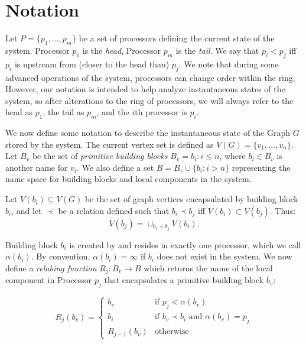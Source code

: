 \documentclass{article}
\begin{document}
\section{Notation}

\noindent
Let $P = \{p_1, \ldots, p_m\}$ be a set of processors defining the
current state of the system. Processor $p_1$ is the \emph{head}, Processor
$p_m$ is the \emph{tail}.  We say that $p_i < p_j$ iff $p_i$ is upstream
from (closer to the head than) $p_j$.  We note that during some advanced
operations of the system, processors can change order within the ring.  
However, our notation is intended to help analyze instantaneous states 
of the system, so after alterations to the ring of processors, we will 
always refer to the head as $p_1$, the tail as $p_m$, and the $i$th
processor is $p_i$.


We now define some notation to describe the instantaneous state of the 
Graph $G$ stored by the system.
The current vertex set is defined as $V(G) = \{v_1, \ldots, v_n\}$.
Let $B_v$ be the set of \emph{primitive building blocks} 
$B_v = {b_i : i \le n}$, where $b_i \in B_v$ is another name for $v_i$.  We
also define a set $B  = B_v \cup \{b_i : i > n\}$ representing the 
name space for building blocks and local components in the system.

Let $V(b_i) \subseteq V(G)$ be the set of graph vertices 
encapsulated by building block $b_i$, and
let $\prec$ be a relation defined such that $b_i \prec b_j$ 
iff $V(b_i) \subset V(b_j)$.  Thus:
\[ V(b_j) = \cup_{b_i \prec b_j} V(b_i). \]

Building block $b_i$ is created by and resides in exactly one processor,
which we call $\alpha(b_i)$. By convention, $\alpha(b_i) = \infty$ if
$b_i$ does not exist in the system.  We now define a \emph{relabing function}
$R_j : B_v \rightarrow B$ which returns the name of the local component in
Processor $p_j$ that encapsulates a primitive building block $b_v$:

\begin{equation}
R_j(b_v) = \begin{cases}
         b_v & \text{if $p_j < \alpha(b_v)$} \\
         b_i & \text{if $b_v \prec b_i$ and $\alpha(b_v) = p_j$} \\
         R_{j-1}(b_v) & \text{otherwise}
	\end{cases}
\end{equation}
\end{document}
